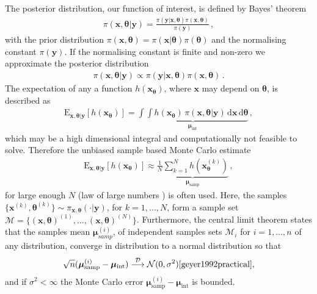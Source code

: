 The posterior distribution, our function of interest, is defined by Bayes' theorem
\begin{align}
	\pi(\bm{x},\bm{\theta}|\bm{y}) = \frac{ \pi(\bm{y} | \bm{x}, \bm{\theta} ) \pi(\bm{x}, \bm{\theta})}{\pi(\bm{y})} \, ,
\end{align}
with the prior distribution $\pi(\bm{x}, \bm{\theta}) = \pi(\bm{x}| \bm{\theta}) \pi(\bm{\theta}) $ and the normalising constant $\pi(\bm{y})$.
If the normalising constant is finite and non-zero we approximate the posterior distribution
\begin{align}
	\pi(\bm{x},\bm{\theta}|\bm{y}) \propto \pi(\bm{y} | \bm{x}, \bm{\theta} ) \pi(\bm{x}, \bm{\theta}) \, .
\end{align}
The expectation of any a function $h(\bm{x}_{\bm{\theta}})$, where $\bm{x}$ may depend on $\bm{\theta}$, is described as 
\begin{align}
	\text{E}_{\bm{x},\bm{\theta}|\bm{y}} [h(\bm{x}_{\bm{\theta}})] =  \underbrace{\int \int   h(\bm{x}_{\bm{\theta}}) \,  \pi(\bm{x}, \bm{\theta} | \bm{y} ) \, \text{d} \bm{x}  \, \text{d} \bm{\theta}}_{\bm{\mu}_{\text{int}}}   \label{eq:expPos} \, ,
\end{align}
which may be a high dimensional integral and computationally not feasible to solve.
Therefore the unbiased \cite{roberts2004general} sample based Monte Carlo estimate
\begin{align}
	\label{eq:sampMean}
	\text{E}_{\bm{x},\bm{\theta}|\bm{y}} [h(\bm{x}_{\bm{\theta}})] \approx \underbrace{ \frac{1}{N} \sum_{k=1}^{N} h(\bm{x}^{(k)}_{\bm{\theta}})  }_{\bm{\mu}_{\text{samp}}} \, ,
\end{align}
for large enough $N$ (law of large numbers \cite[Chapter 17]{tweedie2009measprob}) is often used.
Here, the samples $\{\bm{x}^{(k)},\bm{\theta}^{(k)} \}\sim \pi_{\bm{x}, \bm{\theta}}(\cdot|\bm{y})$, for $k = 1, \dots, N$, form a sample set $\mathcal{M} =\{ (\bm{x},\bm{\theta})^{(1)}, \dots ,  (\bm{x},\bm{\theta})^{(N)} \}$.
Furthermore, the central limit theorem states that the samples mean $ \bm{\mu}^{(i)}_{samp} $, of independent samples sets $\mathcal{M}_i$ for $i = 1, \dots, n$ of any distribution, converge in distribution to a normal distribution so that
\begin{align}
	\sqrt{n} (\bm{\mu}^{(i)}_{\text{samp}} -  \bm{\mu}_{\text{int}} ) \overset{\mathcal{D}}{\longrightarrow} \mathcal{N} (0,\sigma^2) \text{\cite{geyer1992practical}},
\end{align}
and if $\sigma^2 < \infty$ the Monte Carlo error $\bm{\mu}^{(i)}_{\text{samp}} -  \bm{\mu}_{\text{int}} $ is bounded.

